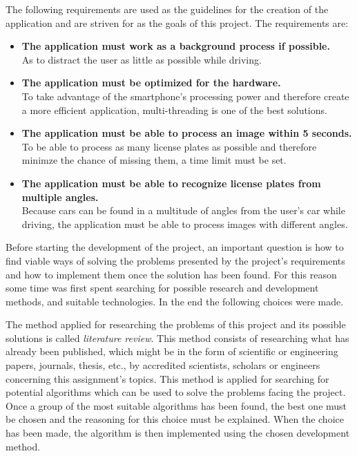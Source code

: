 
The following requirements are used as the guidelines for the creation of the application and are striven for as the goals of this project. The requirements are:

\begin{itemize}
    \item{\textbf{The application must work as a background process if possible.} \\
        As to distract the user as little as possible while driving.
    }

    \item{\textbf{The application must be optimized for the hardware.} \\
        To take advantage of the smartphone's processing power and therefore create a more efficient application, multi-threading is one of the best solutions.
    }

    \item{\textbf{The application must be able to process an image within 5 seconds.} \\
        To be able to process as many license plates as possible and therefore minimze the chance of missing them, a time limit must be set. 
    }
    \item{\textbf{The application must be able to recognize license plates from multiple angles.} \\
        Because cars can be found in a multitude of angles from the user's car while driving, the application must be able to process images with different angles.
    }
\end{itemize}



Before starting the development of the project, an important question is how to find viable ways of solving the problems presented by the project's requirements and how to implement them once the solution has been found. For this reason some time was first spent searching for possible research and development methods, and suitable technologies. In the end the following choices were made.


The method applied for researching the problems of this project and its possible solutions is called \emph{literature review}. This method consists of researching what has already been published, which might be in the form of scientific or engineering papers, journals, thesis, etc., by accredited scientists, scholars or engineers concerning this assignment's topics. 
This method is applied for searching for potential algorithms which can be used to solve the problems facing the project. Once a group of the most suitable algorithms has been found, the best one must be chosen and the reasoning for this choice must be explained. When the choice has been made, the algorithm is then implemented using the chosen development method.


